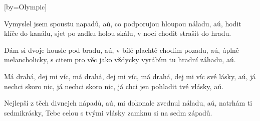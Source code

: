 [by={Olympic}]

\beginverse{}
Vymyslel jsem spoustu napadů, aú,
co podporujou hloupou náladu, aú,
hodit klíče do kanálu, sjet po zadku holou skálu,
v noci chodit strašit do hradu.
\endverse{}

\beginverse{}
\chordsoff{}
Dám si dvoje housle pod bradu, aú,
v bílé plachtě chodím pozadu, aú,
úplně melancholicky, s citem pro věc jako vždycky
vyrábím tu hradní záhadu, aú.
\chordson{}
\endverse{}

\beginchorus{}
Má drahá, dej mi víc, má drahá, dej mi víc,
má drahá, dej mi víc své lásky, aú,
já nechci skoro nic, já nechci skoro nic,
já chci jen pohladit tvé vlásky, aú.
\endchorus{}

\beginverse{}
\chordsoff{}
Nejlepší z těch divnejch nápadů, aú,
mi dokonale zvednul náladu, aú,
natrhám ti sedmikrásky, Tebe celou s tvými vlásky
zamknu si na sedm západů. 
\chordson{}
\endverse{}

\endsong{}
